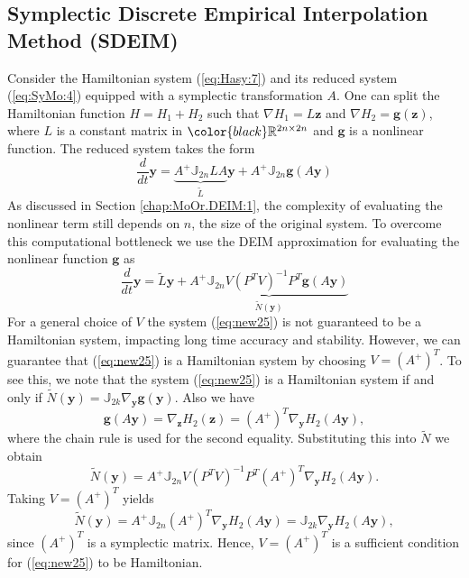 \documentclass[final]{siamart}
\begin{document}
\subsection{Symplectic Discrete Empirical Interpolation Method (SDEIM)} Consider the Hamiltonian system (\ref{eq:Hasy:7}) and its reduced system (\ref{eq:SyMo:4}) equipped with a symplectic transformation $A$. One can split the Hamiltonian function $H = H_1 + H_2$ such that $\nabla H_1 = L\mathbf z$ and $\nabla H_2 = \mathbf g(\mathbf z)$, where $L$ is a constant matrix in ${\color{black}} \mathbb R^{2n\times 2n}$ and $\mathbf g$ is a nonlinear function. The reduced system takes the form
\begin{equation} \label{eq:new24}
	\frac{d}{dt} \mathbf y = \underbrace{A^+ \mathbb J_{2n} L A}_{\tilde L} \mathbf y + A^+ \mathbb J_{2n} \mathbf g(A\mathbf y)
\end{equation}
As discussed in Section \ref{chap:MoOr.DEIM:1}, the complexity of evaluating the nonlinear term still depends on $n$, the size of the original system. To overcome this computational bottleneck we use the DEIM approximation for evaluating the nonlinear function $\mathbf g$ as
\begin{equation} \label{eq:new25}
	\frac{d}{dt} \mathbf y = \tilde L \mathbf y + \underbrace{ A^+ \mathbb J_{2n} V (P^TV)^{-1} P^T \mathbf g(A\mathbf y) }_{\tilde N(\mathbf y)}
\end{equation}
For a general choice of $V$ the system (\ref{eq:new25}) is not guaranteed to be a Hamiltonian system, impacting long time accuracy and stability. However, we can guarantee that (\ref{eq:new25}) is a Hamiltonian system by choosing $V=(A^+)^T$. To {{\color{black}} see this}, we note that the system (\ref{eq:new25}) is a Hamiltonian system if and only if $\tilde N(\mathbf y) = \mathbb J_{2k} \nabla_{\mathbf y} \mathbf g(\mathbf y)$. Also we have 
\begin{equation} \label{eq:new26}
	\mathbf g(A\mathbf y) = \nabla_{\mathbf z} H_2(\mathbf z) = (A^+)^T \nabla_{\mathbf y} H_2(A \mathbf y),
\end{equation}
where the chain rule is used for the second equality. Substituting this into $\tilde N$ we obtain
\begin{equation} \label{eq:new27}
	\tilde N(\mathbf y)= A^+ \mathbb J_{2n} V (P^TV)^{-1} P^T  (A^+)^T \nabla_{\mathbf y} H_2(A \mathbf y).
\end{equation}
Taking $V = (A^+)^T$ yields
\begin{equation} \label{eq:new28}
	\tilde N(\mathbf y) = A^+ \mathbb J_{2n}(A^+)^T \nabla_{\mathbf y} H_2(A \mathbf y) = \mathbb J_{2k} \nabla_{\mathbf y} H_2(A \mathbf y),
\end{equation}
since $(A^+)^T$ is a symplectic matrix. Hence, $V = (A^+)^T$ is a sufficient condition for (\ref{eq:new25}) to {{\color{black}} be Hamiltonian}. 
\end{document}
